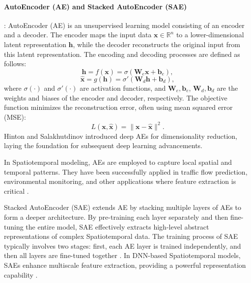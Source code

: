 \documentclass[acmsmall]{acmart}
\begin{document}
\paragraph{AutoEncoder (AE) and Stacked AutoEncoder (SAE)}: AutoEncoder (AE) is an unsupervised learning model consisting of an encoder and a decoder. The encoder maps the input data $\mathbf{x} \in \mathbb{R}^{n}$ to a lower-dimensional latent representation $\mathbf{h}$, while the decoder reconstructs the original input from this latent representation. The encoding and decoding processes are defined as follows:
\begin{equation}
\mathbf{h} = f(\mathbf{x}) = \sigma(\mathbf{W}_e \mathbf{x} + \mathbf{b}_e),
\end{equation}
\begin{equation}
\hat{\mathbf{x}} = g(\mathbf{h}) = \sigma'(\mathbf{W}_d \mathbf{h} + \mathbf{b}_d),
\end{equation}
where $\sigma(\cdot)$ and $\sigma'(\cdot)$ are activation functions, and $\mathbf{W}_e, \mathbf{b}_e$, $\mathbf{W}_d, \mathbf{b}_d$ are the weights and biases of the encoder and decoder, respectively. The objective function minimizes the reconstruction error, often using mean squared error (MSE):
\begin{equation}
L(\mathbf{x}, \hat{\mathbf{x}}) = \| \mathbf{x} - \hat{\mathbf{x}} \|^2.
\end{equation}
Hinton and Salakhutdinov \cite{hinton2006reducing} introduced deep AEs for dimensionality reduction, laying the foundation for subsequent deep learning advancements.

In Spatiotemporal modeling, AEs are employed to capture local spatial and temporal patterns. They have been successfully applied in traffic flow prediction, environmental monitoring, and other applications where feature extraction is critical \cite{vincent2008extracting, bengio2009learning}.

Stacked AutoEncoder (SAE) extends AE by stacking multiple layers of AEs to form a deeper architecture. By pre-training each layer separately and then fine-tuning the entire model, SAE effectively extracts high-level abstract representations of complex Spatiotemporal data. The training process of SAE typically involves two stages: first, each AE layer is trained independently, and then all layers are fine-tuned together \cite{erhan2010why, ranzato2007unsupervised}. In DNN-based Spatiotemporal models, SAEs enhance multiscale feature extraction, providing a powerful representation capability \cite{masci2011stacked, vincent2010stacked}.
\end{document}
